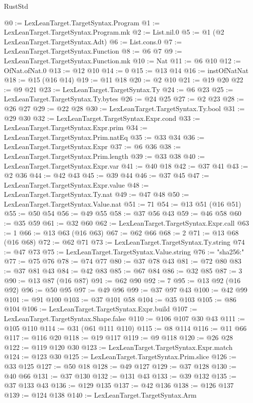 \begin{lexlean}{RustStd}
\begin{coremodule}
@0 := LexLeanTarget.TargetSyntax.Program
@1 := LexLeanTarget.TargetSyntax.Program.mk
@2 := List.nil.{0}
@5 := @1 (@2 LexLeanTarget.TargetSyntax.Adt)
@6 := List.cons.{0}
@7 := LexLeanTarget.TargetSyntax.Function
@8 := @6 @7
@9 := LexLeanTarget.TargetSyntax.Function.mk
@10 := Nat
@11 := @6 @10
@12 := OfNat.ofNat.{0}
@13 := @12 @10
@14 := 0
@15 := @13 @14
@16 := instOfNatNat
@18 := @15 (@16 @14)
@19 := @11 @18
@20 := @2 @10
@21 := @19 @20
@22 := @9 @21
@23 := LexLeanTarget.TargetSyntax.Ty
@24 := @6 @23
@25 := LexLeanTarget.TargetSyntax.Ty.bytes
@26 := @24 @25
@27 := @2 @23
@28 := @26 @27
@29 := @22 @28
@30 := LexLeanTarget.TargetSyntax.Ty.bool
@31 := @29 @30
@32 := LexLeanTarget.TargetSyntax.Expr.cond
@33 := LexLeanTarget.TargetSyntax.Expr.prim
@34 := LexLeanTarget.TargetSyntax.Prim.natEq
@35 := @33 @34
@36 := LexLeanTarget.TargetSyntax.Expr
@37 := @6 @36
@38 := LexLeanTarget.TargetSyntax.Prim.length
@39 := @33 @38
@40 := LexLeanTarget.TargetSyntax.Expr.var
@41 := @40 @18
@42 := @37 @41
@43 := @2 @36
@44 := @42 @43
@45 := @39 @44
@46 := @37 @45
@47 := LexLeanTarget.TargetSyntax.Expr.value
@48 := LexLeanTarget.TargetSyntax.Ty.nat
@49 := @47 @48
@50 := LexLeanTarget.TargetSyntax.Value.nat
@51 := 71
@54 := @13 @51 (@16 @51)
@55 := @50 @54
@56 := @49 @55
@58 := @37 @56 @43
@59 := @46 @58
@60 := @35 @59
@61 := @32 @60
@62 := LexLeanTarget.TargetSyntax.Expr.call
@63 := 1
@66 := @13 @63 (@16 @63)
@67 := @62 @66
@68 := 2
@71 := @13 @68 (@16 @68)
@72 := @62 @71
@73 := LexLeanTarget.TargetSyntax.Ty.string
@74 := @47 @73
@75 := LexLeanTarget.TargetSyntax.Value.string
@76 := "sha256:"
@77 := @75 @76
@78 := @74 @77
@80 := @37 @78 @43
@81 := @72 @80
@83 := @37 @81 @43
@84 := @42 @83
@85 := @67 @84
@86 := @32 @85
@87 := 3
@90 := @13 @87 (@16 @87)
@91 := @62 @90
@92 := 7
@95 := @13 @92 (@16 @92)
@96 := @50 @95
@97 := @49 @96
@99 := @37 @97 @43
@100 := @42 @99
@101 := @91 @100
@103 := @37 @101 @58
@104 := @35 @103
@105 := @86 @104
@106 := LexLeanTarget.TargetSyntax.Expr.build
@107 := LexLeanTarget.TargetSyntax.Shape.false
@110 := @106 @107 @30 @43
@111 := @105 @110
@114 := @31 (@61 @111 @110)
@115 := @8 @114
@116 := @11 @66
@117 := @116 @20
@118 := @19 @117
@119 := @9 @118
@120 := @26 @28
@122 := @119 @120 @30
@123 := LexLeanTarget.TargetSyntax.Expr.match
@124 := @123 @30
@125 := LexLeanTarget.TargetSyntax.Prim.slice
@126 := @33 @125
@127 := @50 @18
@128 := @49 @127
@129 := @37 @128
@130 := @40 @66
@131 := @37 @130
@132 := @131 @43
@133 := @39 @132
@135 := @37 @133 @43
@136 := @129 @135
@137 := @42 @136
@138 := @126 @137
@139 := @124 @138
@140 := LexLeanTarget.TargetSyntax.Arm

\end{coremodule}
\end{lexlean}
